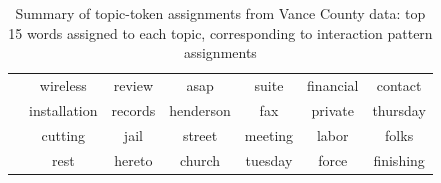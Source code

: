 \documentclass[a4paper]{article}
\begin{document}
\begin{table}[ht]
{\begin{tabular}{ |c||c|c|c||c|c|c|}
               			&wireless & review& asap& suite & financial& contact\\
               			&installation & records& henderson&fax & private& thursday\\
               			&cutting&jail & street &meeting& labor& folks\\
               			&rest& hereto & church & tuesday& force& finishing\\
               			\hline
               		\end{tabular}}
               		\label{table:TableVance}
               		\caption{Summary of topic-token assignments from Vance County data: top 15 words assigned to each topic, corresponding to interaction pattern assignments}
               	\end{table}
               	
\end{document}
